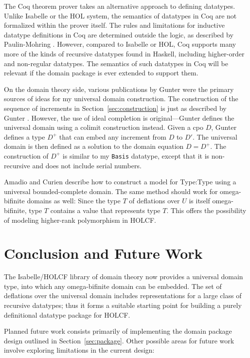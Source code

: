 \documentclass{llncs}
\begin{document}
The Coq theorem prover takes an alternative approach to defining
datatypes.  Unlike Isabelle or the HOL system, the semantics of
datatypes in Coq are not formalized within the prover itself.  The
rules and limitations for inductive datatype definitions in Coq are
determined outside the logic, as described by Paulin-Mohring
\cite{paulinmohring93}.  However, compared to Isabelle or HOL, Coq
supports many more of the kinds of recursive datatypes found in
Haskell, including higher-order and non-regular datatypes.  The
semantics of such datatypes in Coq will be relevant if the domain
package is ever extended to support them.

On the domain theory side, various publications by Gunter
\cite{gunter85thesis,gunter87universal,gunter92semantics} were the
primary sources of ideas for my universal domain construction.  The
construction of the sequence of increments in
Section~\ref{sec:construction} is just as described by Gunter
\cite[\S5]{gunter87universal}.  However, the use of ideal completion
is original---Gunter defines the universal domain using a colimit
construction instead.  Given a cpo $D$, Gunter defines a type $D^+$
that can embed any increment from $D$ to $D'$.  The universal domain
is then defined as a solution to the domain equation $D = D^+$.  The
construction of $D^+$ is similar to my \texttt{Basis} datatype, except
that it is non-recursive and does not include serial numbers.

Amadio and Curien \cite{amadio+curien} describe how to construct a
model for Type:Type using a universal bounded-complete domain.  The
same method should work for omega-bifinite domains as well: Since the
type $T$ of deflations over $U$ is itself omega-bifinite, type $T$
contains a value that represents type $T$.  This offers the possibility
of modeling higher-rank polymorphism in HOLCF.

\section{\label{sec:conclusion}Conclusion and Future Work}

The Isabelle/HOLCF library of domain theory now provides a universal
domain type, into which any omega-bifinite domain can be embedded.
The set of deflations over the universal domain includes
representations for a large class of recursive datatypes; thus it
forms a suitable starting point for building a purely definitional
datatype package for HOLCF.

Planned future work consists primarily of implementing the domain
package design outlined in Section~\ref{sec:package}.  Other possible
areas for future work involve exploring limitations in the
current design:
\end{document}
